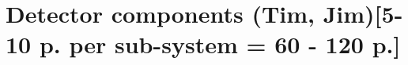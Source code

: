 \ifdefined\isfinal\documentclass[final]{pd-tdr}\else\documentclass{pd-tdr}\fi
\begin{document}
%
%
%
%
%

%

%

%

\chapter{Detector components {\color{red} (Tim, Jim)[5-10 p. per sub-system = 60 - 120 p.]}}


%

%

%

%







%


% 

\cleardoublepage


\end{document}
